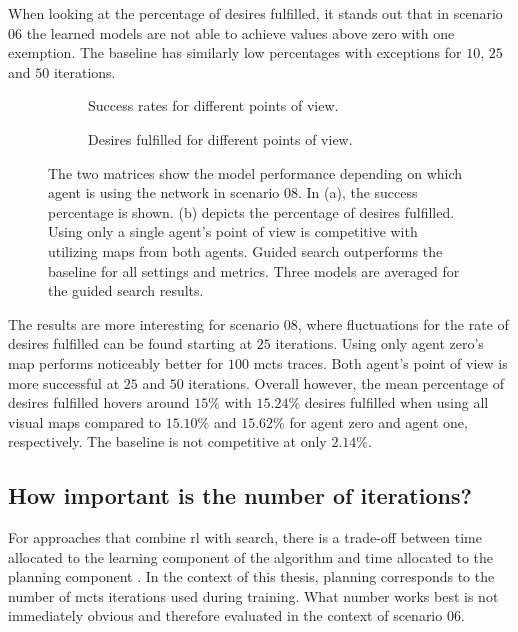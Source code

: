When looking at the percentage of desires fulfilled, it stands out that in scenario 06 the learned models are not able to achieve values above zero with one exemption. The baseline has similarly low percentages with exceptions for $10$, $25$ and $50$ iterations.
\begin{figure}
\begin{subfigure}{.5\textwidth}
  \centering
  \scalebox{0.5}{
  
  }
  \caption{Success rates for different points of view.}
  \label{fig:sc10_success_matrix}
\end{subfigure}
\begin{subfigure}{.5\textwidth}
  \centering
  \scalebox{0.5}{
  
  }
  \caption{Desires fulfilled for different points of view.}
  \label{fig:sc10_desire_matrix}
\end{subfigure}
\caption[Success rate and desires fulfilled in scenario 08]{The two matrices show the model performance depending on which agent is using the network in scenario 08. In (a), the success percentage is shown. (b) depicts the percentage of desires fulfilled. Using only a single agent's point of view is competitive with utilizing maps from both agents. Guided search outperforms the baseline for all settings and metrics. Three models are averaged for the guided search results.}
\label{fig:sc_10_vs_baseline}
\end{figure}

The results are more interesting for scenario 08, where fluctuations for the rate of desires fulfilled can be found starting at $25$ iterations. Using only agent zero's map performs noticeably better for $100$ \gls{mcts} traces. Both agent's point of view is more successful at $25$ and $50$ iterations. Overall however, the mean percentage of desires fulfilled hovers around $15 \%$ with $15.24 \%$ desires fulfilled when using all visual maps compared to $15.10 \%$ and $15.62 \%$ for agent zero and agent one, respectively. The baseline is not competitive at only $2.14 \%$.

\clearpage

\subsection{How important is the number of iterations?}\label{ssec:eval_of_hyperparameters}
For approaches that combine \gls{rl} with search, there is a trade-off between time allocated to the learning component of the algorithm and time allocated to the planning component \cite{moerlandThinkTooFast2020}. In the context of this thesis, planning corresponds to the number of \gls{mcts} iterations used during training. What number works best is not immediately obvious and therefore evaluated in the context of scenario 06.

